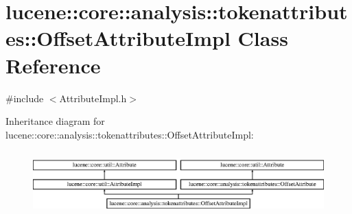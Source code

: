 \hypertarget{classlucene_1_1core_1_1analysis_1_1tokenattributes_1_1OffsetAttributeImpl}{}\section{lucene\+:\+:core\+:\+:analysis\+:\+:tokenattributes\+:\+:Offset\+Attribute\+Impl Class Reference}
\label{classlucene_1_1core_1_1analysis_1_1tokenattributes_1_1OffsetAttributeImpl}


{\ttfamily \#include $<$Attribute\+Impl.\+h$>$}

Inheritance diagram for lucene\+:\+:core\+:\+:analysis\+:\+:tokenattributes\+:\+:Offset\+Attribute\+Impl\+:\begin{figure}[H]
\begin{center}
\leavevmode
\includegraphics[height=2.485207cm]{classlucene_1_1core_1_1analysis_1_1tokenattributes_1_1OffsetAttributeImpl}
\end{center}
\end{figure}
